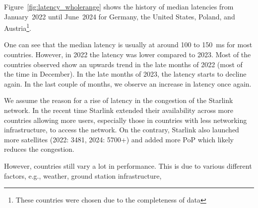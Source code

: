 Figure~\ref{fig:latency_wholerange} shows the history of median latencies from January~2022 until June~2024 for Germany, the United States, Poland, and Austria\footnote{These countries were chosen due to the completeness of data}.

One can see that the median latency is usually at around 100 to 150~ms for most countries. However, in 2022 the latency was lower compared to 2023. Most of the countries observed show an upwards trend in the late months of 2022 (most of the time in December). In the late months of 2023, the latency starts to decline again. In the last couple of months, we observe an increase in latency once again.

We assume the reason for a rise of latency in the congestion of the Starlink network. In the recent time Starlink extended their availability across more countries allowing more users, especially those in countries with less networking infrastructure, to access the network.
On the contrary, Starlink also launched more satellites (2022: 3481, 2024: 5700+) and added more \ac{PoP} which likely reduces the congestion.

However, countries still vary a lot in performance. This is due to various different factors, e.g., weather, ground station infrastructure,
